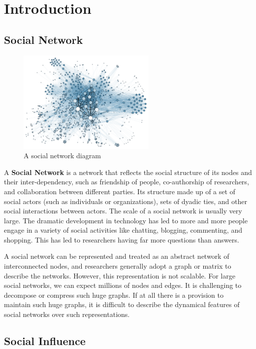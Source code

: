 \chapter{Introduction}


\section{Social Network}

\begin{figure}
    \centering
    \includegraphics[height=5cm]{tex/img/social_network.png}
    \caption{A social network diagram}
\end{figure}

A \textbf{Social Network} is a network that reflects the social structure of its nodes and their inter-dependency, such as friendship of people, co-authorship of researchers, and collaboration between different parties. Its structure made up of a set of social actors (such as individuals or organizations), sets of dyadic ties, and other social interactions between actors. The scale of a social network is usually very large. The dramatic development in technology has led to more and more people engage in a variety of social activities like chatting, blogging, commenting, and shopping. This has led to researchers having far more questions than answers. 


A social network can be represented and treated as an abstract network of interconnected nodes, and researchers generally adopt a graph or matrix to describe the networks. However, this representation is not scalable. For large social networks, we can expect millions of nodes and edges. It is challenging to decompose or compress such huge graphs. If at all there is a provision to maintain such huge graphs, it is difficult to describe the dynamical features of social networks over such representations. 

\section{Social Influence}

